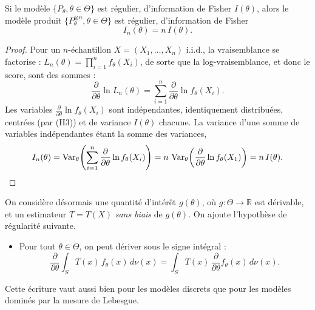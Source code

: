 \begin{mdframed}
\begin{proposition}
Si le modèle $\{P_\theta, \theta \in \Theta\}$ est régulier, d'information de
Fisher $I(\theta)$, alors le modèle produit
$\{P_\theta^{\otimes n}, \theta \in \Theta\}$ est régulier, d'information de Fisher
\[
  I_n(\theta) = n\, I(\theta).
\]
\end{proposition}
\end{mdframed}

\begin{proof}
Pour un $n$-échantillon $X = (X_1, \dots, X_n)$ i.i.d., la vraisemblance se
factorise : $L_n(\theta) = \prod_{i=1}^{n} f_\theta(X_i)$, de sorte que la
log-vraisemblance, et donc le score, sont des sommes :
\[
  \frac{\partial}{\partial\theta} \ln L_n(\theta)
  = \sum_{i=1}^{n} \frac{\partial}{\partial\theta} \ln f_\theta(X_i).
\]
Les variables $\frac{\partial}{\partial\theta} \ln f_\theta(X_i)$ sont
indépendantes, identiquement distribuées, centrées (par (H3)) et de variance
$I(\theta)$ chacune. La variance d'une somme de variables indépendantes étant la
somme des variances,
\[
  I_n(\theta)
  = \operatorname{Var}_\theta\!\left( \sum_{i=1}^{n}
    \frac{\partial}{\partial\theta} \ln f_\theta(X_i) \right)
  = n\, \operatorname{Var}_\theta\!\left( \frac{\partial}{\partial\theta} \ln f_\theta(X_1) \right)
  = n\, I(\theta). \qedhere
\]
\end{proof}

On considère désormais une quantité d'intérêt $g(\theta)$, où $g : \Theta \to
\mathbb{R}$ est dérivable, et un estimateur $T = T(X)$ \emph{sans biais} de
$g(\theta)$. On ajoute l'hypothèse de régularité suivante.

\begin{itemize}
  \item[\textbf{(H5)}] Pour tout $\theta \in \Theta$, on peut dériver sous le signe
        intégral :
        \[
          \frac{\partial}{\partial\theta} \int_S T(x)\, f_\theta(x)\, d\nu(x)
          = \int_S T(x)\, \frac{\partial}{\partial\theta} f_\theta(x)\, d\nu(x).
        \]
\end{itemize}

Cette écriture vaut aussi bien pour les modèles discrets que pour les modèles
dominés par la mesure de Lebesgue.

